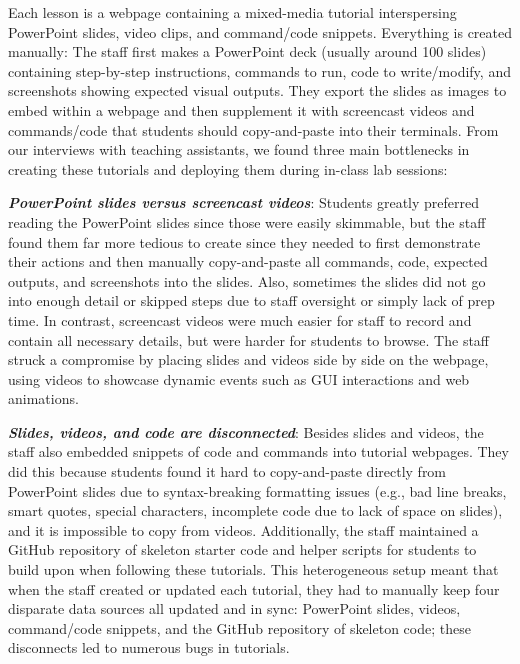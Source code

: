 
Each lesson is a webpage containing a mixed-media tutorial interspersing
PowerPoint slides, video clips, and command/code snippets.
%
Everything is created manually: The staff first makes
a PowerPoint deck (usually around 100 slides) containing step-by-step
instructions, commands to run, code to write/modify, and screenshots
showing expected visual outputs. They export the slides as images to
embed within a webpage and then supplement it with screencast videos and
commands/code that students should copy-and-paste into their terminals.
%
%
From our interviews with teaching assistants, we found three main
bottlenecks in creating these tutorials and deploying them during
in-class lab sessions:

\textbf{\emph{PowerPoint slides versus screencast videos}}: Students
greatly preferred reading the PowerPoint slides since those were easily
skimmable, but the staff found them far more tedious to create since
they needed to first demonstrate their actions and then manually
copy-and-paste all commands, code, expected outputs, and screenshots
into the slides. Also, sometimes the slides did not go into enough
detail or skipped steps due to staff oversight or simply lack of prep time. In contrast, screencast videos were much easier for staff to record and
contain all necessary details, but were harder for students to browse.
The staff struck a compromise by placing slides and videos side by side
on the webpage, using videos to showcase
dynamic events such as GUI interactions and web animations.

\textbf{\emph{Slides, videos, and code are disconnected}}: Besides
slides and videos, the staff also embedded snippets of code and commands
into tutorial webpages. They did this because
students found it hard to copy-and-paste directly from PowerPoint slides
due to syntax-breaking formatting issues (e.g., bad line breaks, smart
quotes, special characters, incomplete code due to lack of space on
slides), and it is impossible to copy from videos. Additionally, the
staff maintained a GitHub repository of skeleton starter code and helper
scripts for students to build upon when following these tutorials. This
heterogeneous setup meant that when the staff created or updated each
tutorial, they had to manually keep four disparate data sources all
updated and in sync:
PowerPoint slides, videos, command/code snippets, and the GitHub
repository of skeleton code; these disconnects led to numerous bugs in
tutorials.


